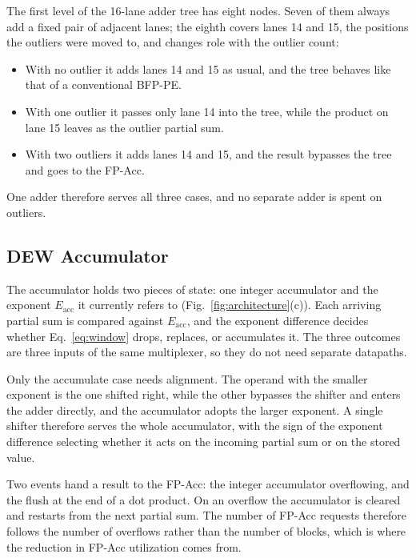 The first level of the 16-lane adder tree has eight nodes.
Seven of them always add a fixed pair of adjacent lanes; the eighth covers lanes 14 and 15, the positions the outliers were moved to, and changes role with the outlier count:
\begin{itemize}
    \item With no outlier it adds lanes 14 and 15 as usual, and the tree behaves like that of a conventional BFP-PE.
    \item With one outlier it passes only lane 14 into the tree, while the product on lane 15 leaves as the outlier partial sum.
    \item With two outliers it adds lanes 14 and 15, and the result bypasses the tree and goes to the FP-Acc.
\end{itemize}
One adder therefore serves all three cases, and no separate adder is spent on outliers.

\subsection{DEW Accumulator}
\label{subsec:dew_acc}
The accumulator holds two pieces of state: one integer accumulator and the exponent $E_{\mathrm{acc}}$ it currently refers to (Fig.~\ref{fig:architecture}(c)).
Each arriving partial sum is compared against $E_{\mathrm{acc}}$, and the exponent difference decides whether Eq.~\eqref{eq:window} drops, replaces, or accumulates it.
The three outcomes are three inputs of the same multiplexer, so they do not need separate datapaths.

Only the accumulate case needs alignment.
The operand with the smaller exponent is the one shifted right, while the other bypasses the shifter and enters the adder directly, and the accumulator adopts the larger exponent.
A single shifter therefore serves the whole accumulator, with the sign of the exponent difference selecting whether it acts on the incoming partial sum or on the stored value.

Two events hand a result to the FP-Acc: the integer accumulator overflowing, and the flush at the end of a dot product.
On an overflow the accumulator is cleared and restarts from the next partial sum.
The number of FP-Acc requests therefore follows the number of overflows rather than the number of blocks, which is where the reduction in FP-Acc utilization comes from.
